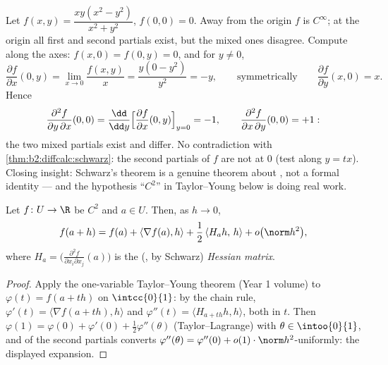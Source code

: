 \begin{example}\label{ex:b2:diffcalc:peano}
Let $f(x, y) = \dfrac{xy(x^2 - y^2)}{x^2 + y^2}$, $f(0,0) = 0$.
Away from the origin $f$ is $C^\infty$; at the origin all first
and second partials exist, but the mixed ones disagree. Compute
along the axes: $f(x, 0) = f(0, y) = 0$, and for $y \neq 0$,
\[
\frac{\partial f}{\partial x}(0, y)
= \lim_{x\to0}\frac{f(x,y)}{x}
= \frac{y(0 - y^2)}{y^2} = -y ,
\qquad\text{symmetrically}\qquad
\frac{\partial f}{\partial y}(x, 0) = x .
\]
Hence
\[
\frac{\partial^2 f}{\partial y\,\partial x}(0,0)
= \frac{\dd}{\dd y}\Bigl[\frac{\partial f}{\partial
x}(0,y)\Bigr]_{y=0} = -1,
\qquad
\frac{\partial^2 f}{\partial x\,\partial y}(0,0) = +1 :
\]
the two mixed partials exist and differ. No contradiction with
\cref{thm:b2:diffcalc:schwarz}: the second partials of $f$ are
not  at $0$ (test along $y = tx$). Closing insight:
Schwarz's theorem is a genuine theorem about \emph{},
not a formal identity --- and the hypothesis ``$C^2$'' in
Taylor--Young below is doing real work.
\end{example}

\begin{theorem}\label{thm:b2:diffcalc:taylor}
Let $f \colon U \to \R$ be $C^2$ and $a \in U$. Then, as $h \to 0$,
\[
f(a + h) = f(a) + \langle\nabla f(a), h\rangle
+ \frac12\, \langle H_a h,\, h\rangle + o\bigl(\norm h^2\bigr),
\]
where $H_a = \bigl(\frac{\partial^2 f}{\partial x_i\partial
x_j}(a)\bigr)$ is the (, by Schwarz) \emph{Hessian
matrix}.
\end{theorem}

\begin{proof}
Apply the one-variable Taylor--Young theorem (Year 1 volume) to
$\varphi(t) = f(a + th)$ on $\intcc{0}{1}$: by the chain rule,
$\varphi'(t) = \langle \nabla f(a + th), h\rangle$ and $\varphi''(t)
= \langle H_{a+th}h, h\rangle$, both  in $t$. Then
$\varphi(1) = \varphi(0) + \varphi'(0) + \frac12\varphi''(\theta)$
(Taylor--Lagrange) with $\theta \in \intoo{0}{1}$, and 
of the second partials converts $\varphi''(\theta) =
\varphi''(0) + o(1)\cdot\norm h^2$-uniformly: the displayed
expansion.
\end{proof}


